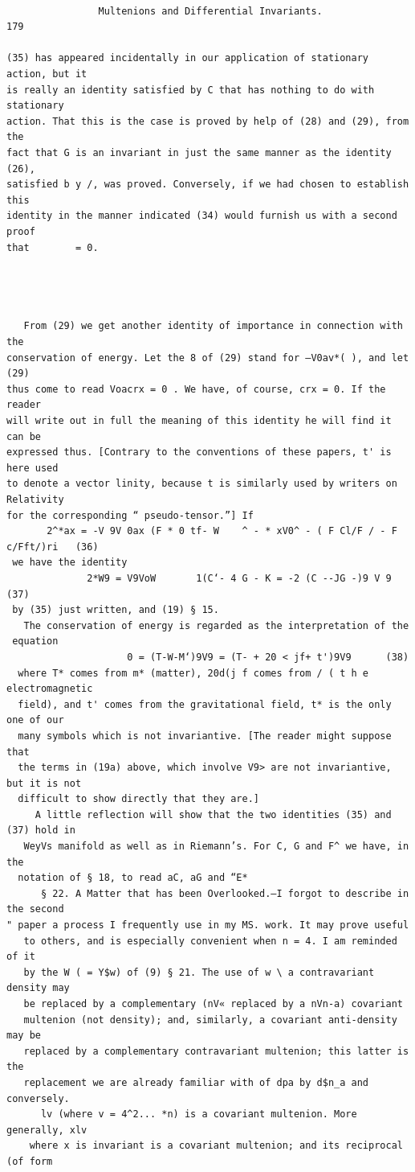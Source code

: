 \documentclass[10pt]{article}
\begin{document}
\clearpage
\begin{verbatim}

                Multenions and Differential Invariants.                          179

(35) has appeared incidentally in our application of stationary action, but it
is really an identity satisfied by C that has nothing to do with stationary
action. That this is the case is proved by help of (28) and (29), from the
fact that G is an invariant in just the same manner as the identity (26),
satisfied b y /, was proved. Conversely, if we had chosen to establish this
identity in the manner indicated (34) would furnish us with a second proof
that        = 0.




   From (29) we get another identity of importance in connection with the
conservation of energy. Let the 8 of (29) stand for —V0av*( ), and let (29)
thus come to read Voacrx = 0 . We have, of course, crx = 0. If the reader
will write out in full the meaning of this identity he will find it can be
expressed thus. [Contrary to the conventions of these papers, t' is here used
to denote a vector linity, because t is similarly used by writers on Relativity
for the corresponding “ pseudo-tensor.”] If
       2^*ax = -V 9V 0ax (F * 0 tf- W    ^ - * xV0^ - ( F Cl/F / - F c/Fft/)ri   (36)
 we have the identity
              2*W9 = V9VoW       1(C‘- 4 G - K = -2 (C --JG -)9 V 9              (37)
 by (35) just written, and (19) § 15.
   The conservation of energy is regarded as the interpretation of the
 equation
                     0 = (T-W-M‘)9V9 = (T- + 20 < jf+ t')9V9      (38)
  where T* comes from m* (matter), 20d(j f comes from / ( t h e electromagnetic
  field), and t' comes from the gravitational field, t* is the only one of our
  many symbols which is not invariantive. [The reader might suppose that
  the terms in (19a) above, which involve V9> are not invariantive, but it is not
  difficult to show directly that they are.]
     A little reflection will show that the two identities (35) and (37) hold in
   WeyVs manifold as well as in Riemann’s. For C, G and F^ we have, in the
  notation of § 18, to read aC, aG and “E*
      § 22. A Matter that has been Overlooked.—I forgot to describe in the second
" paper a process I frequently use in my MS. work. It may prove useful
   to others, and is especially convenient when n = 4. I am reminded of it
   by the W ( = Y$w) of (9) § 21. The use of w \ a contravariant density may
   be replaced by a complementary (nV« replaced by a nVn-a) covariant
   multenion (not density); and, similarly, a covariant anti-density may be
   replaced by a complementary contravariant multenion; this latter is the
   replacement we are already familiar with of dpa by d$n_a and conversely.
      lv (where v = 4^2... *n) is a covariant multenion. More generally, xlv
    where x is invariant is a covariant multenion; and its reciprocal (of form


\end{verbatim}
\end{document}
